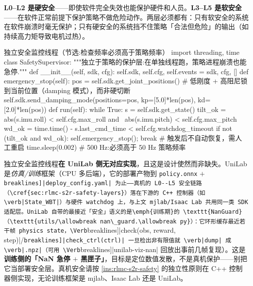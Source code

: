\textbf{L0--L2 是硬安全}——即使软件完全失效也能保护硬件和人员。\textbf{L3--L5 是软安全}——在软件正常前提下保护策略不做危险动作。两层必须都有：只有软安全的系统在软件崩溃时毫无保护；只有硬安全的系统挡不住策略「合法但危险」的输出（如持续高力矩导致电机过热）。

\begin{codebox}[Python]{独立安全监控线程（节选:检查频率必须高于策略频率）}
import threading, time
class SafetySupervisor:
    """独立于策略的保护层:在单独线程跑，策略进程崩溃也能急停."""
    def __init__(self, sdk, cfg):
        self.sdk, self.cfg, self.events = sdk, cfg, []
    def emergency_stop(self):
        pos = self.sdk.get_joint_positions()
        # 低刚度 + 高阻尼锁到当前位置（damping 模式），而非硬切断
        self.sdk.send_damping_mode(positions=pos,
                                   kp=[5.0]*len(pos), kd=[2.0]*len(pos))
    def run(self):
        while True:
            s = self.sdk.get_state()
            tilt_ok = abs(s.imu.roll) < self.cfg.max_roll and \
                      abs(s.imu.pitch) < self.cfg.max_pitch
            wd_ok   = time.time() - s.last_cmd_time < self.cfg.watchdog_timeout
            if not (tilt_ok and wd_ok):
                self.emergency_stop(); break        # 触发后不自动恢复，需人工重启
            time.sleep(0.002)                        # 500 Hz:必须高于 50 Hz 策略频率
\end{codebox}

\begin{note}
独立安全监控线程\textbf{在 UniLab 侧无对应实现}，且这是设计使然而非缺失。UniLab 是\emph{仿真/训练}框架（CPU 多后端），它的部署产物到 \verb|policy.onnx| $+$ \Verb[breaklines]|deploy_config.yaml| 为止——真机的 L0--L5 安全链路（\cref{sec:rlmc-s2r-safety-layers}）落在下游的 C++ 控制器（如 \verb|State_WBT|）与硬件 watchdog 上，与上文 mjlab/Isaac Lab 共用同一类 SDK 适配层。UniLab 自带的最接近「安全」语义的是\emph{训练期}的 \texttt{NanGuard}（\texttt{utils/\allowbreak nan\_guard.\allowbreak py}）：它环形缓存最近若干帧 physics state，\Verb[breaklines]|check(obs, reward, step)|/\allowbreak\Verb[breaklines]|check_ctrl(ctrl)| 一旦检出非有限值就 \verb|dump| 成 \verb|.npz|（可用 \Verb[breaklines]|unilab-viz-nan| 回放出事前几帧复现）。这是\textbf{训练侧的「NaN 急停 $+$ 黑匣子」}，目标是定位数值发散，不是真机保护——别把它当部署安全层。真机安全请按 \cref{ins:rlmc-s2r-safety} 的独立性原则在 C++ 控制器侧实现，无论训练框架是 mjlab、Isaac Lab 还是 UniLab。
\end{note}

